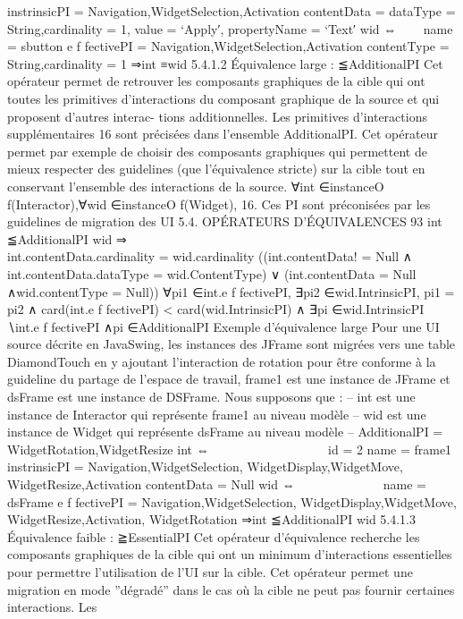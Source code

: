 \documentclass{article}
\begin{document}
instrinsicPI = {Navigation,WidgetSelection,Activation}
contentData = {dataType = String,cardinality = 1,
value = ‘Apply′, propertyName = ‘Text′}
wid ⇔



name = sbutton
e f fectivePI = {Navigation,WidgetSelection,Activation}
contentType = String,cardinality = 1
⇒int ≡wid
5.4.1.2
Équivalence large : ≦AdditionalPI
Cet opérateur permet de retrouver les composants graphiques de la cible qui ont toutes les
primitives d’interactions du composant graphique de la source et qui proposent d’autres interac-
tions additionnelles. Les primitives d’interactions supplémentaires 16 sont précisées dans l’ensemble
AdditionalPI. Cet opérateur permet par exemple de choisir des composants graphiques qui permettent
de mieux respecter des guidelines (que l’équivalence stricte) sur la cible tout en conservant l’ensemble
des interactions de la source.
∀int ∈instanceO f(Interactor),∀wid ∈instanceO f(Widget),
16. Ces PI sont préconisées par les guidelines de migration des UI
5.4. OPÉRATEURS D’ÉQUIVALENCES
93
int ≦AdditionalPI wid ⇒











































int.contentData.cardinality = wid.cardinality
((int.contentData! = Null
∧
int.contentData.dataType = wid.ContentType)
∨
(int.contentData = Null ∧wid.contentType = Null))
∀pi1 ∈int.e f fectivePI,
∃pi2 ∈wid.IntrinsicPI,
pi1 = pi2
∧
card(int.e f fectivePI) < card(wid.IntrinsicPI)
∧
∃pi ∈wid.IntrinsicPI ∖int.e f fectivePI ∧pi ∈AdditionalPI
Exemple d’équivalence large
Pour une UI source décrite en JavaSwing, les instances des JFrame
sont migrées vers une table DiamondTouch en y ajoutant l’interaction de rotation pour être conforme
à la guideline du partage de l’espace de travail, frame1 est une instance de JFrame et dsFrame est une
instance de DSFrame. Nous supposons que :
– int est une instance de Interactor qui représente frame1 au niveau modèle
– wid est une instance de Widget qui représente dsFrame au niveau modèle
– AdditionalPI = {WidgetRotation,WidgetResize}
int ⇔















id = 2
name = frame1
instrinsicPI = {Navigation,WidgetSelection,
WidgetDisplay,WidgetMove,
WidgetResize,Activation}
contentData = Null
wid ⇔











name = dsFrame
e f fectivePI = {Navigation,WidgetSelection,
WidgetDisplay,WidgetMove,
WidgetResize,Activation,
WidgetRotation}
⇒int ≦AdditionalPI wid
5.4.1.3
Équivalence faible : ≧EssentialPI
Cet opérateur d’équivalence recherche les composants graphiques de la cible qui ont un minimum
d’interactions essentielles pour permettre l’utilisation de l’UI sur la cible. Cet opérateur permet une
migration en mode ”dégradé” dans le cas où la cible ne peut pas fournir certaines interactions. Les
\end{document}
